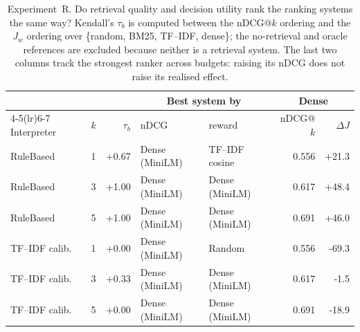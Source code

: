\begin{table}[t]
\caption{Experiment~R. Do retrieval quality and decision utility rank the
ranking systems the same way? Kendall's $\tau_b$ is computed between the
nDCG@$k$ ordering and the $J_w$ ordering over \{random, BM25, TF--IDF,
dense\}; the no-retrieval and oracle references are excluded because neither
is a retrieval system. The last two columns track the strongest ranker
across budgets: raising its nDCG does not raise its realised effect.}
\label{tab:rankagreement}
\centering\small\setlength{\tabcolsep}{4pt}
\begin{tabular}{llrllrr}
\toprule
 & & & \multicolumn{2}{c}{Best system by} & \multicolumn{2}{c}{Dense} \\
\cmidrule(lr){4-5}\cmidrule(lr){6-7}
Interpreter & $k$ & $\tau_b$ & nDCG & reward & nDCG@$k$ & $\Delta J$ \\
\midrule
RuleBased & 1 & +0.67 & Dense (MiniLM) & TF--IDF cosine & 0.556 & +21.3 \\
RuleBased & 3 & +1.00 & Dense (MiniLM) & Dense (MiniLM) & 0.617 & +48.4 \\
RuleBased & 5 & +1.00 & Dense (MiniLM) & Dense (MiniLM) & 0.691 & +46.0 \\
TF--IDF calib. & 1 & +0.00 & Dense (MiniLM) & Random & 0.556 & -69.3 \\
TF--IDF calib. & 3 & +0.33 & Dense (MiniLM) & Dense (MiniLM) & 0.617 & -1.5 \\
TF--IDF calib. & 5 & +0.00 & Dense (MiniLM) & Dense (MiniLM) & 0.691 & -18.9 \\
\bottomrule
\end{tabular}
\end{table}
